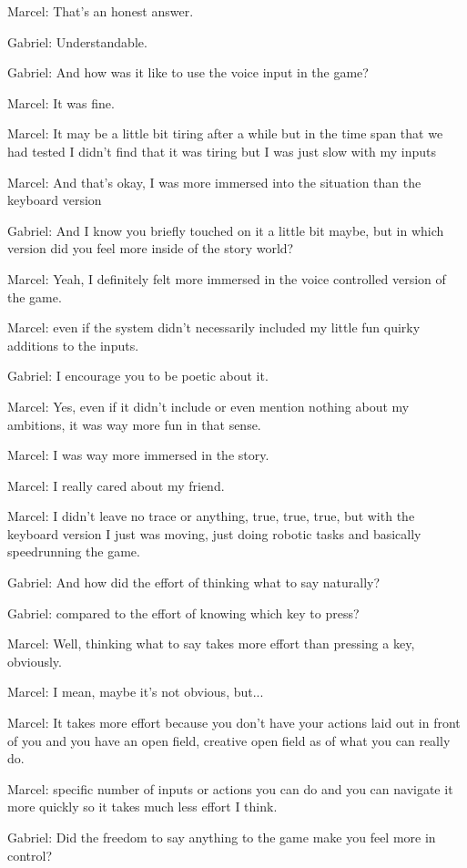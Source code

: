 Marcel: That's an honest answer.

Gabriel: Understandable.

Gabriel: And how was it like to use the voice input in the game?

Marcel: It was fine.

Marcel: It may be a little bit tiring after a while but in the time span that we had tested I didn't find that it was tiring but I was just slow with my inputs

Marcel: And that's okay, I was more immersed into the situation than the keyboard version

Gabriel: And I know you briefly touched on it a little bit maybe, but in which version did you feel more inside of the story world?

Marcel: Yeah, I definitely felt more immersed in the voice controlled version of the game.

Marcel: even if the system didn't necessarily included my little fun quirky additions to the inputs.

Gabriel: I encourage you to be poetic about it.

Marcel: Yes, even if it didn't include or even mention nothing about my ambitions, it was way more fun in that sense.

Marcel: I was way more immersed in the story.

Marcel: I really cared about my friend.

Marcel: I didn't leave no trace or anything, true, true, true, but with the keyboard version I just was moving, just doing robotic tasks and basically speedrunning the game.

Gabriel: And how did the effort of thinking what to say naturally?

Gabriel: compared to the effort of knowing which key to press?

Marcel: Well, thinking what to say takes more effort than pressing a key, obviously.

Marcel: I mean, maybe it's not obvious, but...

Marcel: It takes more effort because you don't have your actions laid out in front of you and you have an open field, creative open field as of what you can really do.

Marcel: specific number of inputs or actions you can do and you can navigate it more quickly so it takes much less effort I think.

Gabriel: Did the freedom to say anything to the game make you feel more in control?


